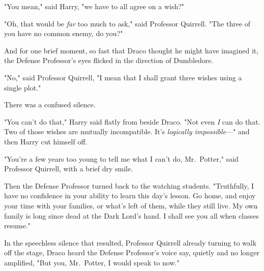 "You mean," said Harry, "we have to all agree on a wish?"

"Oh, that would be \emph{far} too much to ask," said Professor Quirrell. "The
three of you have no common enemy, do you?"

And for one brief moment, so fast that Draco thought he might have imagined it,
the Defense Professor's eyes flicked in the direction of Dumbledore.

"No," said Professor Quirrell, "I mean that I shall grant three wishes using a
single plot."

There was a confused silence.

"You can't do that," Harry said flatly from beside Draco. "Not even \emph{I}
can do that. Two of those wishes are mutually incompatible. It's
\emph{logically impossible}\mbox{---}" and then Harry cut himself off.

"You're a few years too young to tell me what I can't do, Mr.~Potter," said
Professor Quirrell, with a brief dry smile.

Then the Defense Professor turned back to the watching students. "Truthfully, I
have no confidence in your ability to learn this day's lesson. Go home, and
enjoy your time with your families, or what's left of them, while they still
live. My own family is long since dead at the Dark Lord's hand. I shall see you
all when classes resume."

In the speechless silence that resulted, Professor Quirrell already turning to
walk off the stage, Draco heard the Defense Professor's voice say, quietly and
no longer amplified, "But you, Mr.~Potter, I would speak to now."
